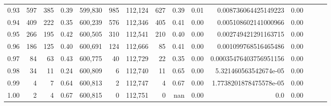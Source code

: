 \begin{tabular}{rrrrrrrrrrrrrrr}
0.93 &     597 &    385 &  0.39 &  599,830 &      985 &  112,124 &      627 &  0.39 &  0.01 &    0.008736064425149223 &      0.00 \\
0.94 &     409 &    222 &  0.35 &  600,239 &      576 &  112,346 &      405 &  0.41 &  0.00 &    0.005108602141000966 &      0.00 \\
0.95 &     266 &    195 &  0.42 &  600,505 &      310 &  112,541 &      210 &  0.40 &  0.00 &    0.002749421291163715 &      0.00 \\
0.96 &     186 &    125 &  0.40 &  600,691 &      124 &  112,666 &       85 &  0.41 &  0.00 &    0.001099768516465486 &      0.00 \\
0.97 &      84 &     63 &  0.43 &  600,775 &       40 &  112,729 &       22 &  0.35 &  0.00 &  0.00035476403756951156 &      0.00 \\
0.98 &      34 &     11 &  0.24 &  600,809 &        6 &  112,740 &       11 &  0.65 &  0.00 &   5.321460563542674e-05 &      0.00 \\
0.99 &       4 &      7 &  0.64 &  600,813 &        2 &  112,747 &        4 &  0.67 &  0.00 &  1.7738201878475578e-05 &      0.00 \\
1.00 &       2 &      4 &  0.67 &  600,815 &        0 &  112,751 &        0 &   nan &  0.00 &                     0.0 &      0.00 \\
\bottomrule
\end{tabular}
